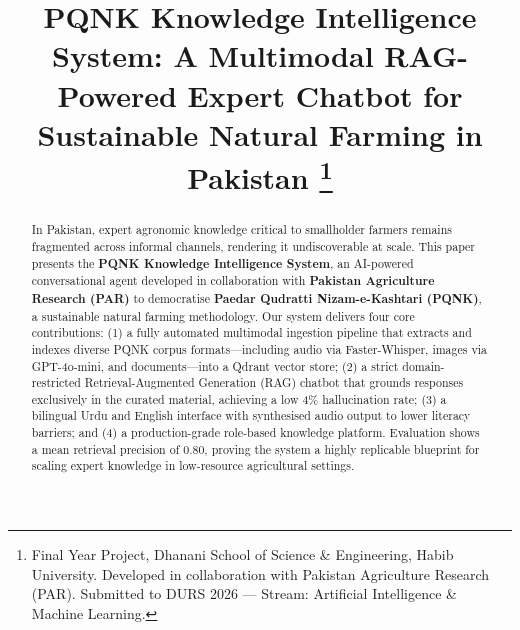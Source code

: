 \documentclass[conference]{IEEEtran}
\begin{document}
\title{PQNK Knowledge Intelligence System: A Multimodal RAG-Powered Expert Chatbot for
Sustainable Natural Farming in Pakistan%
\thanks{Final Year Project, Dhanani School of Science \& Engineering, Habib University.
Developed in collaboration with Pakistan Agriculture Research (PAR).
Submitted to DURS 2026 — Stream: Artificial Intelligence \& Machine Learning.}
}

\author{
}

\maketitle

\begin{abstract}
In Pakistan, expert agronomic knowledge critical to smallholder farmers remains fragmented across informal channels, rendering it undiscoverable at scale. This paper presents the \textbf{PQNK Knowledge Intelligence System}, an AI-powered conversational agent developed in collaboration with \textbf{Pakistan Agriculture Research (PAR)} to democratise \textbf{Paedar Qudratti Nizam-e-Kashtari (PQNK)}, a sustainable natural farming methodology. Our system delivers four core contributions: (1) a fully automated multimodal ingestion pipeline that extracts and indexes diverse PQNK corpus formats---including audio via Faster-Whisper, images via GPT-4o-mini, and documents---into a Qdrant vector store; (2) a strict domain-restricted Retrieval-Augmented Generation (RAG) chatbot that grounds responses exclusively in the curated material, achieving a low 4\% hallucination rate; (3) a bilingual Urdu and English interface with synthesised audio output to lower literacy barriers; and (4) a production-grade role-based knowledge platform. Evaluation shows a mean retrieval precision of 0.80, proving the system a highly replicable blueprint for scaling expert knowledge in low-resource agricultural settings.
\end{abstract}
\end{document}
